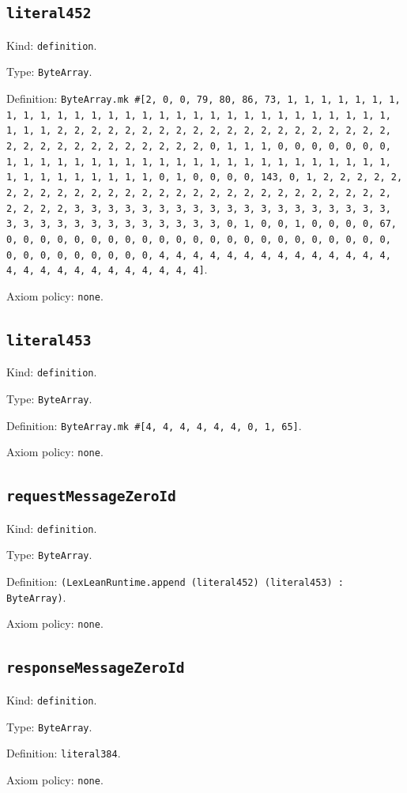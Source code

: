 \documentclass[11pt]{article}
\begin{document}
\subsection*{\texttt{literal452}}
\noindent Kind: \texttt{definition}.\par
\noindent Type: \texttt{ByteArray}.\par
\noindent Definition: \texttt{ByteArray.mk \#[2, 0, 0, 79, 80, 86, 73, 1, 1, 1, 1, 1, 1, 1, 1, 1, 1, 1, 1, 1, 1, 1, 1, 1, 1, 1, 1, 1, 1, 1, 1, 1, 1, 1, 1, 1, 1, 1, 1, 1, 2, 2, 2, 2, 2, 2, 2, 2, 2, 2, 2, 2, 2, 2, 2, 2, 2, 2, 2, 2, 2, 2, 2, 2, 2, 2, 2, 2, 2, 2, 2, 2, 0, 1, 1, 1, 0, 0, 0, 0, 0, 0, 0, 1, 1, 1, 1, 1, 1, 1, 1, 1, 1, 1, 1, 1, 1, 1, 1, 1, 1, 1, 1, 1, 1, 1, 1, 1, 1, 1, 1, 1, 1, 1, 1, 0, 1, 0, 0, 0, 0, 143, 0, 1, 2, 2, 2, 2, 2, 2, 2, 2, 2, 2, 2, 2, 2, 2, 2, 2, 2, 2, 2, 2, 2, 2, 2, 2, 2, 2, 2, 2, 2, 2, 2, 2, 3, 3, 3, 3, 3, 3, 3, 3, 3, 3, 3, 3, 3, 3, 3, 3, 3, 3, 3, 3, 3, 3, 3, 3, 3, 3, 3, 3, 3, 3, 3, 3, 0, 1, 0, 0, 1, 0, 0, 0, 0, 67, 0, 0, 0, 0, 0, 0, 0, 0, 0, 0, 0, 0, 0, 0, 0, 0, 0, 0, 0, 0, 0, 0, 0, 0, 0, 0, 0, 0, 0, 0, 0, 0, 4, 4, 4, 4, 4, 4, 4, 4, 4, 4, 4, 4, 4, 4, 4, 4, 4, 4, 4, 4, 4, 4, 4, 4, 4, 4]}.\par
\noindent Axiom policy: \texttt{none}.\par
\subsection*{\texttt{literal453}}
\noindent Kind: \texttt{definition}.\par
\noindent Type: \texttt{ByteArray}.\par
\noindent Definition: \texttt{ByteArray.mk \#[4, 4, 4, 4, 4, 4, 0, 1, 65]}.\par
\noindent Axiom policy: \texttt{none}.\par
\subsection*{\texttt{requestMessageZeroId}}
\noindent Kind: \texttt{definition}.\par
\noindent Type: \texttt{ByteArray}.\par
\noindent Definition: \texttt{(LexLeanRuntime.append (literal452) (literal453) : ByteArray)}.\par
\noindent Axiom policy: \texttt{none}.\par
\subsection*{\texttt{responseMessageZeroId}}
\noindent Kind: \texttt{definition}.\par
\noindent Type: \texttt{ByteArray}.\par
\noindent Definition: \texttt{literal384}.\par
\noindent Axiom policy: \texttt{none}.\par
\end{document}
